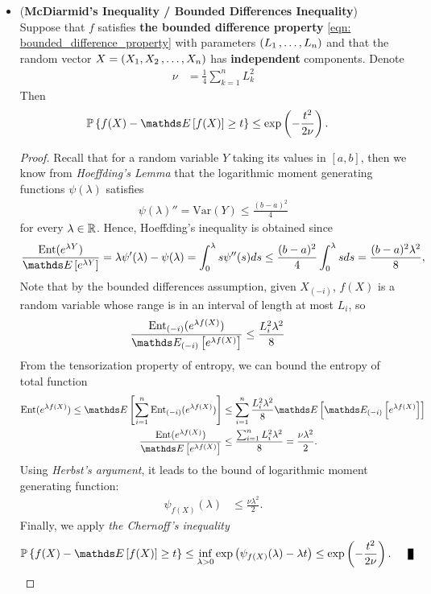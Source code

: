 \documentclass[11pt]{article}
\begin{document}
\begin{itemize}
\item \begin{proposition} (\textbf{McDiarmid's Inequality / Bounded Differences Inequality})\citep{boucheron2013concentration, wainwright2019high}\\
Suppose that $f$ satisfies \textbf{the bounded difference property} \eqref{eqn: bounded_difference_property} with parameters $(L_1 \,{,}\ldots{,}\, L_n)$ and that the random vector $X = (X_1, X_2 \,{,}\ldots{,}\, X_n)$ has \textbf{independent} components. Denote
\begin{align*}
\nu &= \frac{1}{4} \sum_{k=1}^{n}L_k^2
\end{align*}
Then
\begin{align*}
\bP\set{f(X) - \E{}{f(X)} \ge t } &\le   \exp\paren{- \frac{t^2}{2 \nu}}. 
\end{align*}
\end{proposition}
\begin{proof}
Recall that for a random variable $Y$ taking its values in $[a, b]$, then we know from \emph{Hoeffding's Lemma} that the logarithmic moment generating functions $\psi(\lambda)$ satisfies
\begin{align*}
\psi(\lambda)'' = \text{Var}(Y) \le \frac{(b-a)^2}{4}
\end{align*} for every $\lambda \in {\mathbb R}$. Hence, Hoeffding's inequality is obtained since
\begin{align*}
\frac{\text{Ent}(e^{\lambda Y})}{\E{}{e^{\lambda Y}}} = \lambda \psi'(\lambda) - \psi(\lambda) = \int_{0}^{\lambda} s \psi''(s) ds \le \frac{(b-a)^2}{4}  \int_{0}^{\lambda} s ds =  \frac{(b-a)^2 \lambda^2}{8},
\end{align*} Note that by the bounded differences assumption, given $X_{(-i)}$, $f(X)$ is a random variable whose range is in an interval of length at most $L_i$, so 
\begin{align*}
\frac{\text{Ent}_{(-i)}(e^{\lambda f(X)})}{\E{(-i)}{e^{\lambda f(X)}}} &\le  \frac{L_i^2 \lambda^2}{8} 
\end{align*} 
From the  tensorization property of entropy, we can bound the entropy of total function
\begin{align*}
\text{Ent}(e^{\lambda f(X)}) \le \E{}{\sum_{i=1}^{n}\text{Ent}_{(-i)}(e^{\lambda f(X)})} &\le \sum_{i=1}^{n} \frac{L_i^2 \lambda^2}{8} \E{}{\E{(-i)}{e^{\lambda f(X)}}}\\
\frac{\text{Ent}(e^{\lambda f(X)}) }{ \E{}{e^{\lambda f(X)}} } &\le \frac{\sum_{i=1}^{n}L_i^2 \lambda^2}{8} = \frac{\nu \lambda^2}{2}.
\end{align*} Using \emph{Herbst's argument}, it leads to the bound of logarithmic moment generating function:
\begin{align*}
\psi_{f(X)}(\lambda) &\le \frac{\nu \lambda^2}{2}.
\end{align*} Finally, we apply \emph{the Chernoff's inequality}
\begin{align*}
\bP\set{f(X) - \E{}{f(X)} \ge t } &\le  \inf_{\lambda >0 }\exp\paren{\psi_{f(X)}(\lambda) - \lambda t} \le \exp\paren{- \frac{t^2}{2 \nu}}.  \qed
\end{align*}
\end{proof}


\end{itemize}
\end{document}
